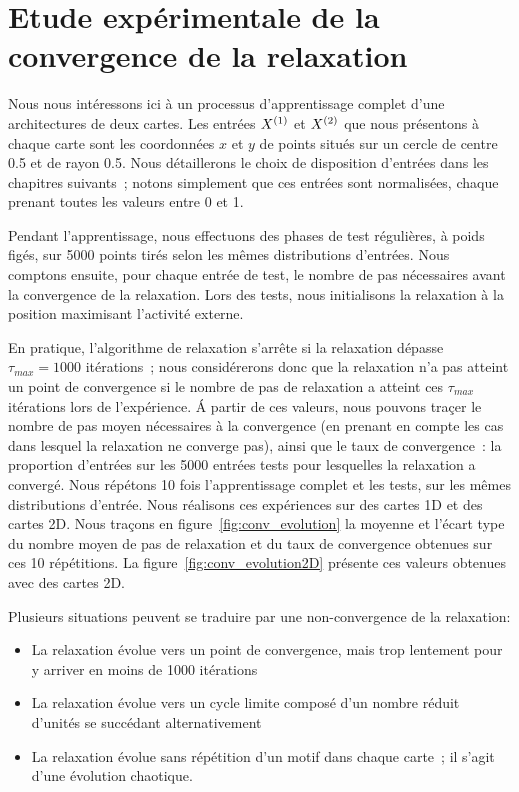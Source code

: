 \documentclass[../main]{subfiles}
\begin{document}
\section{Etude expérimentale de la convergence de la relaxation}

Nous nous intéressons ici  à un processus d'apprentissage complet d'une architectures de deux cartes. Les entrées $X^{({1})}$ et $X^{({2})}$ que nous présentons à chaque carte sont les coordonnées $x$ et $y$ de points situés sur un cercle de centre 0.5 et de rayon 0.5. 
Nous détaillerons le choix de disposition d'entrées dans les chapitres suivants~; notons simplement que ces entrées sont normalisées, chaque prenant toutes les valeurs entre 0 et 1. 

Pendant l'apprentissage, nous effectuons des phases de test régulières, à poids figés, sur 5000 points tirés selon les mêmes distributions d'entrées. 
Nous comptons ensuite, pour chaque entrée de test, le nombre de pas nécessaires avant la convergence de la relaxation. Lors des tests, nous initialisons la relaxation à la position maximisant l'activité externe.

En pratique, l'algorithme de relaxation s'arrête si la relaxation dépasse $\tau_{max}= 1000$ itérations~; nous considérerons donc que la relaxation n'a pas atteint un point de convergence si le nombre de pas de relaxation a atteint ces $\tau_{max}$ itérations lors de l'expérience. 
\'A partir de ces valeurs, nous pouvons traçer le nombre de pas moyen nécessaires à la convergence (en prenant en compte les cas dans lesquel la relaxation ne converge pas), ainsi que le taux de convergence~: la proportion d'entrées sur les 5000 entrées tests pour lesquelles la relaxation a convergé.
Nous répétons 10 fois l'apprentissage complet et les tests, sur les mêmes distributions d'entrée.
Nous réalisons ces expériences sur des cartes 1D et des cartes 2D.
Nous traçons en figure~\ref{fig:conv_evolution} la moyenne et l'écart type du nombre moyen de pas de relaxation et du taux de convergence obtenues sur ces 10 répétitions. La figure~\ref{fig:conv_evolution2D} présente ces valeurs obtenues avec des cartes 2D.

Plusieurs situations peuvent se traduire par une non-convergence de la relaxation:
\begin{itemize}
\item La relaxation évolue vers un point de convergence, mais trop lentement pour y arriver en moins de 1000 itérations
\item La relaxation évolue vers un cycle limite composé d'un nombre réduit d'unités se succédant alternativement
\item La relaxation évolue sans répétition d'un motif dans chaque carte~; il s'agit d'une évolution chaotique.
\end{itemize}
\end{document}
